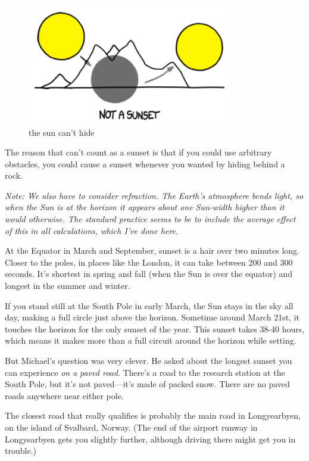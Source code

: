 \begin{figure}[!htbp]
\centering
\includegraphics[scale=0.5, max width=0.8\textwidth]{imgs/a/42/sunset_mountain.png}
\caption{the sun can’t hide}
\end{figure}

{The reason that can’t count as a sunset is that if you could use arbitrary obstacles, you could cause a sunset whenever you wanted by hiding behind a rock.}

{ \emph{Note: We also have to consider refraction. The Earth’s atmosphere bends light, so when the Sun is at the horizon it appears about one Sun-width higher than it would otherwise. The standard practice seems to be to include the average effect of this in all calculations, which I’ve done here.} }

{At the Equator in March and September, sunset is a hair over two minutes long. Closer to the poles, in places like the London, it can take between 200 and 300 seconds. It’s shortest in spring and fall (when the Sun is over the equator) and longest in the summer and winter.}

{If you stand still at the South Pole in early March, the Sun stays in the sky all day, making a full circle just above the horizon. Sometime around March 21st, it touches the horizon for the only sunset of the year. This sunset takes 38-40 hours, which means it makes more than a full circuit around the horizon while setting.}

{But Michael’s question was very clever. He asked about the longest sunset you can experience \emph{on a} \emph{paved road}. There’s a road to the research station at the South Pole, but it’s not paved—it’s made of packed snow. There are no paved roads anywhere near either pole.}

{The closest road that really qualifies is probably the main road in Longyearbyen, on the island of Svalbard, Norway. (The end of the airport runway in Longyearbyen gets you slightly further, although driving there might get you in trouble.)}

